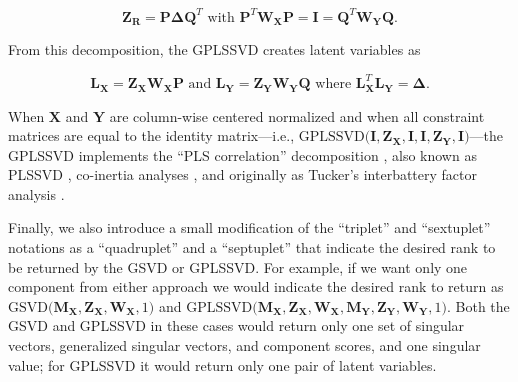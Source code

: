 \documentclass[12pt]{article}
\begin{document}
\begin{equation}
{\mathbf Z}_{\mathbf R} = {\mathbf P} {\boldsymbol \Delta} {\mathbf Q}^{T}
\textrm{ with }
{\mathbf P}^{T}{\mathbf W}_{\mathbf X}{\mathbf P} = {\mathbf I} =
{\mathbf Q}^{T}{\mathbf W}_{\mathbf Y}{\mathbf Q}.
\end{equation}

From this decomposition, the GPLSSVD creates latent variables as

\begin{equation}
{\mathbf L}_{\mathbf X} 
= {\mathbf Z}_{\mathbf X}{\mathbf W}_{\mathbf X}{\mathbf P} 
\textrm{ and } 
{\mathbf L}_{\mathbf Y} = 
{\mathbf Z}_{\mathbf Y}{\mathbf W}_{\mathbf Y}{\mathbf Q}
\textrm{ where }
{\mathbf L}_{\mathbf X}^{T} {\mathbf L}_{\mathbf Y} 
= {\boldsymbol \Delta}. 
\end{equation}

When \({\mathbf X}\) and \({\mathbf Y}\) are column-wise centered
normalized and when all constraint matrices are equal to the identity
matrix---i.e.,
\(\mathrm{GPLSSVD(} {\mathbf I}, {\mathbf Z}_{\mathbf X}, {\mathbf I}, {\mathbf I}, {\mathbf Z}_{\mathbf Y}, {\mathbf I} \mathrm{)}\)---the
GPLSSVD implements the ``PLS correlation'' decomposition
\citep{krishnan_partial_2011, bookstein1994partial, mcintosh_spatial_1996},
also known as PLSSVD \citep{tenenhaus_regression_1998}, co-inertia
analyses \citep[\citet{dray2014}]{doledec1994}, and originally as
Tucker's interbattery factor analysis \citep{tucker_inter-battery_1958}.

Finally, we also introduce a small modification of the ``triplet'' and
``sextuplet'' notations as a ``quadruplet'' and a ``septuplet'' that
indicate the desired rank to be returned by the GSVD or GPLSSVD. For
example, if we want only one component from either approach we would
indicate the desired rank to return as
\(\mathrm{GSVD(} {\mathbf M}_{{\mathbf X}}, {\mathbf Z}_{\mathbf X}, {\mathbf W}_{{\mathbf X}}, 1 \mathrm{)}\)
and
\(\mathrm{GPLSSVD(} {\mathbf M}_{\mathbf X}, {\mathbf Z}_{\mathbf X}, {\mathbf W}_{\mathbf X}, {\mathbf M}_{\mathbf Y}, {\mathbf Z}_{\mathbf Y}, {\mathbf W}_{\mathbf Y}, 1 \mathrm{)}\).
Both the GSVD and GPLSSVD in these cases would return only one set of
singular vectors, generalized singular vectors, and component scores,
and one singular value; for GPLSSVD it would return only one pair of
latent variables.
\end{document}
